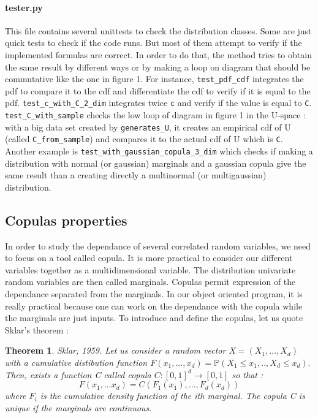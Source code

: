 \documentclass{article}
\begin{document}
	 \paragraph{tester.py}
	This file contains several unittests to check the distribution classes. Some are just quick tests to check if the code runs. But most of them attempt to verify if the implemented formulas are correct. In order to do that, the method tries to obtain the same result by different ways or by making a loop on diagram that should be commutative like the one in figure 1. For instance, \texttt{test\_pdf\_cdf} integrates the pdf to compare it to the cdf and differentiate the cdf to verify if it is equal to the pdf. \texttt{test\_c\_with\_C\_2\_dim} integrates twice \texttt{c} and verify if the value is equal to \texttt{C}. \texttt{test\_C\_with\_sample} checks the low loop of diagram in figure 1 in the U-space : with a big data set created by \texttt{generates\_U}, it creates an empirical cdf of U (called \texttt{C\_from\_sample}) and compares it to the actual cdf of U which is \texttt{C}. Another example is \texttt{test\_with\_gaussian\_copula\_3\_dim} which checks if making a distribution with normal (or gaussian) marginals and a gaussian copula give the same result than a creating directly a multinormal (or multigaussian) distribution. \newline	 

	 
	 
 
   
   \subsection{Copulas properties}

	In order to study the dependance of several correlated random variables, we need to focus on a tool called copula. It is more practical to consider our different variables together as a multidimensional variable. The distribution univariate random variables are then called marginals. Copulas permit expression of the dependance separated from the marginals. In our object oriented program, it is really practical because one can work on the dependance with the copula while the marginals are just inputs. To introduce and define the copulas, let us quote Sklar's theorem :
	\newtheorem{Sklar}{Theorem}
	\begin{Sklar}
		Sklar, 1959. Let us consider a random vector $X = (X_{1},...,X_{d})$ with a 			cumulative distibution function $F(x_{1},...,x_{d})= \mathbb{P}(X_{1}\leq 	x_{1},..,X_{d}\leq x_{d}).$ \newline
	Then, exists a function C called copula $C : [0,1]^{d}\to [0,1]$ so that :	
	\begin{equation*}
	F(x_{1},...x_{d})=C(F_{1}(x_{1}),...,F_{d}(x_{d}))
	\end{equation*}
	where $F_{i}$ is the cumulative density function of the ith marginal.\newline%
	The copula C is unique if the marginals are continuous.
	\end{Sklar}
	
\end{document}
